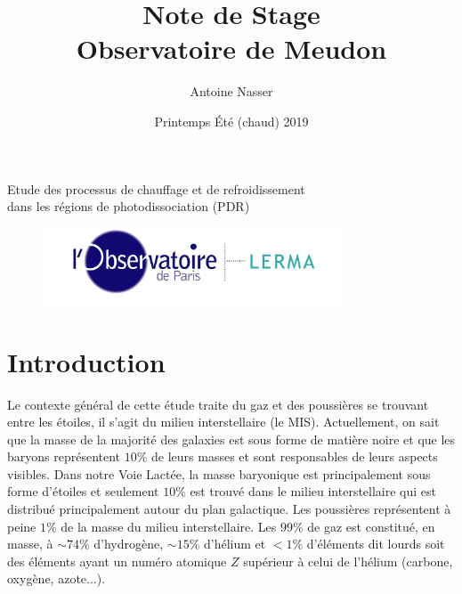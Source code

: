 \documentclass[11pt,a4paper]{article}
\title{Note de Stage\\Observatoire de Meudon}
\author{Antoine Nasser}
\date{Printemps Été (chaud) 2019}
\begin{document}
\begin{spacing}{0.98}


\maketitle
\begin{center}{\Large Etude des processus de chauffage et de refroidissement \\ dans les régions de photodissociation (PDR)}\end{center}


\setcounter{secnumdepth}{4}
\vfill
\begin{figure}[!hb]
        \centering 
        \includegraphics[trim = {0 0 0 0cm},clip,width=0.8\textwidth]{figure/LERMA2.jpg}
\end{figure}
\vfill

\newpage 

\tableofcontents

\setcounter{figure}{0}    

\newpage

 
\section*{Introduction}


Le contexte général de cette étude traite du gaz et des poussières se trouvant entre les étoiles, il s'agit du milieu interstellaire (le MIS). Actuellement, on sait que la masse de la majorité des galaxies est sous forme de matière noire et que les baryons représentent $10\%$ de leurs masses et sont responsables de leurs aspects visibles. Dans notre Voie Lactée, la masse baryonique est principalement sous forme d'étoiles et seulement $10\%$ est trouvé dans le milieu interstellaire qui est distribué principalement autour du plan galactique. Les poussières représentent à peine $1\%$ de la masse du milieu interstellaire. Les $99\%$ de gaz est constitué, en masse, à $\sim 74\%$ d'hydrogène, $\sim 15\%$ d'hélium et $<1\%$ d'éléments dit \og lourds \fg{} soit des éléments ayant un numéro atomique $Z$ supérieur à celui de l'hélium (carbone, oxygène, azote...).\newline 


\end{spacing}
\end{document}

